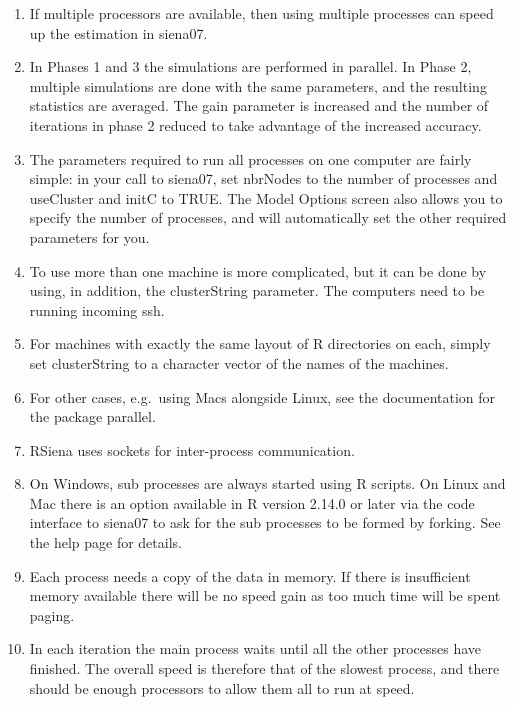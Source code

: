 \documentclass[a4paper,fleqn,11pt]{article}
\newcommand{\+}{\, + \,}
\newcommand{\sfn}[1]{\textsf{#1}}
\newcommand{\R}{{\sf R }}
\newcommand{\RS}{{\sf RSiena }}
\begin{document}
\begin{enumerate}
\item
If multiple processors are available, then using
multiple processes can speed up the estimation in \sfn{siena07}.

\item In Phases 1 and 3 the simulations are performed in parallel. In Phase 2,
  multiple simulations are done with the same parameters, and the resulting
  statistics are averaged. The gain parameter is increased and the
  number of iterations in phase 2 reduced to take advantage of
  the increased accuracy.

\item The parameters required to run all processes on one computer are fairly
  simple: in your call to \sfn{siena07}, set \sfn{nbrNodes} to the number of
  processes and \sfn{useCluster} and \sfn{initC} to TRUE. The \sfn{Model
    Options} screen also allows you to specify the number of processes, and
  will automatically set the other required parameters for you.

\item To use more than one machine is more complicated, but it can be done by
  using, in addition, the \sfn{clusterString} parameter.  The computers need to
  be running incoming \sfn{ssh}.
\item For machines with exactly the same layout of \R
  directories on each, simply set \sfn{clusterString} to a character vector of
  the names of the machines.
\item For other cases, e.g.\ using Macs alongside Linux,
  see the documentation for the package \sfn{parallel}.

\item \RS uses sockets for inter-process communication.
\item On Windows, sub processes are always started using \R scripts. On Linux
  and Mac there is an option available in \R version 2.14.0 or later via the
  code interface to \sfn{siena07} to ask for the sub processes to be formed by
  forking. See the help page for details.
\item Each process needs a copy of the data in memory. If there is insufficient
  memory available there will be no speed gain as too much time will be spent
  paging.
\item In each iteration the main process waits until all the other processes
  have finished. The overall speed is therefore that of the slowest process, and
  there should be enough processors to allow them all to run at speed.
\end{enumerate}
\end{document}
